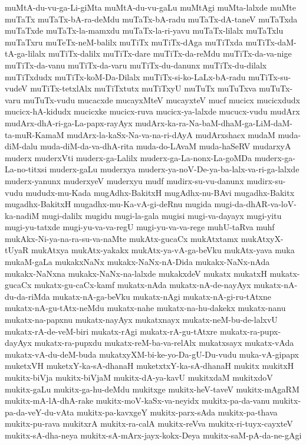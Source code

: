 {muMtA-du-vu-ga-Li-giMta
muMtA-du-vu-gaLu
muMtAgi
muMta-lalxde
muMte
muTaTx
muTaTx-bA-ra-deMdu
muTaTx-bA-radu
muTaTx-dA-taneV
muTaTxda
muTaTxde
muTaTx-la-mamxdu
muTaTx-la-ri-yavu
muTaTx-lilalx
muTaTxlu
muTaTxru
muTeTx-neM-balilx
muTiTx
muTiTx-dAga
muTiTxda
muTiTx-daM-tA-ga-lilalx
muTiTx-dalilx
muTiTx-dare
muTiTx-da-reMdu
muTiTx-da-va-nige
muTiTx-da-vanu
muTiTx-da-varu
muTiTx-du-danunx
muTiTx-du-dilalx
muTiTxdudx
muTiTx-koM-Da-Dilalx
muTiTx-si-ko-LaLx-bA-radu
muTiTx-su-vudeV
muTiTx-tetxlAlx
muTiTxtutx
muTiTxyU
muTuTx
muTuTxva
muTuTx-varu
muTuTx-vudu
mucacxde
mucayxMteV
mucayxteV
mucf
mucicx
mucicxdudx
mucicx-hA-kidudx
mucicxke
mucicx-ruva
mucicx-ya-lalxde
mucucx-vudu
mudArx
mudArx-dhA-ri-ga-La-papx-rayAyx
mudArx-ka-ra-Na-baM-dhaM-ga-LiM-daM-ta-muR-KamaM
mudArx-la-kaSx-Na-va-na-ri-dAyA
mudArxshacx
mudaM
muda-diM-dalu
muda-diM-da-va-dhA-rita
muda-do-LAvaM
muda-haSeRV
mudarxyA
muderx
muderxVti
muderx-ga-Lalilx
muderx-ga-La-nonx-La-goMDa
muderx-ga-La-no-titxsi
muderx-gaLu
muderxya
muderx-ya-noV-De-ya-ba-lalx-va-ri-ga-lalxde
muderx-yanunx
muderxyeV
muderxyu
mudf
mudirx-su-vu-danunx
mudirx-su-vudu
mududx-mu-Kada
mugAdhx-BakitxH
mugAdhx-nu-BAvi
mugadhx-Bakitx
mugadhx-BakitxH
mugadhx-mu-Ka-vA-gi-deRnu
mugida
mugi-da-dhAR-va-loV-ka-nadiM
mugi-dalilx
mugidu
mugi-la-gala
mugisi
mugi-va-dayayx
mugi-yitu
mugi-yu-tatxde
mugi-yu-va-va-regU
mugi-yu-va-va-rege
muhU-taRva
muhf
mukAkx-Ni-ya-na-ra-su-va-naMte
mukAtx-gucaCx
mukAtxtamx
mukAtxyX-tUyaR
mukAtxya
mukAtx-yakakx
mukAtx-ya-vA-ga-beVku
mukAtx-yava
muka
mukaM-gaLa
mukakxNaNx
mukakx-NaNx-nA-Dida
mukakx-NaNx-nAda
mukakx-NaNxna
mukakx-NaNx-na-lalxde
mukakxdeV
mukatx
mukatxH
mukatx-gucaCx
mukatx-gu-caCx-kamf
mukatx-nAda
mukatx-nA-de-nayAyx
mukatx-nA-du-da-riMda
mukatx-nA-ga-beVku
mukatx-nAgi
mukatx-nA-gi-ru-tAtxne
mukatx-nA-gu-tAtx-neMdu
mukatx-nahe
mukatx-na-hu-dakekx
mukatx-nanu
mukatx-na-papxnu
mukatx-nayAyx
mukatxnayx
mukatx-neM-bu-de-lalxvU
mukatx-rA-de-veM-biri
mukatx-rAgi
mukatx-rA-gu-tAtxre
mukatx-ra-pupx-dayAyx
mukatx-ra-pupxdu
mukatx-reM-ba-va-relAlx
mukatxsayx
mukatx-vAda
mukatx-vA-du-deM-buda
mukatxyXM-bi-ke-yo-Da-gU-Du-vudu
muka-vA-gipapx
muketxVH
muketxY-ka-sA-dhanaH
muketxtxY-ka-sA-dhanaH
mukitx
mukitxH
mukitx-biVja
mukitx-biVjaM
mukitx-dA-ya-kavU
mukitxdaM
mukitxdoV
mukitx-gaLu
mukitx-ga-hu-deMdu
mukitxge
mukitx-heV-taveV
mukitx-mAgaRM
mukitx-mA-lA-dhA-rake
mukitx-moV-kaSx-va-neyidx
mukitx-pa-da-vanu
mukitx-pa-da-veY-du-vAta
mukitx-pa-kavxgeY
mukitx-parx-sAda
mukitx-pa-thava
mukitx-pu-rava
mukitxrA
mukitx-ra-calA
mukitx-reVva
mukitx-ri-tuyx-cayxteV
mukitx-sA-dha-neya
mukitx-sA-mArx-jayx-kokx-Deya
mukitx-saM-pA-da-ne-gAgi
}
